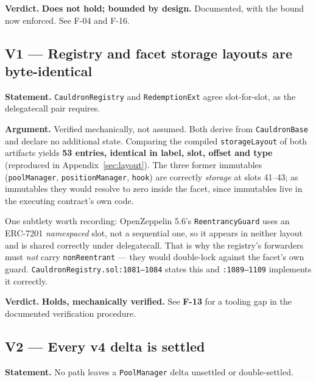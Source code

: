 \documentclass[11pt,a4paper]{article}
\newcommand{\code}[1]{\texttt{\small #1}}
\newcommand{\fileref}[1]{\texttt{\scriptsize #1}}
\begin{document}
\textbf{Verdict.} \textcolor{medium}{\textbf{Does not hold; bounded by design.}}
Documented, with the bound now enforced. See F-04 and F-16.

\subsection*{V1 --- Registry and facet storage layouts are byte-identical}
\textbf{Statement.} \code{CauldronRegistry} and \code{RedemptionExt} agree
slot-for-slot, as the delegatecall pair requires.

\textbf{Argument.} Verified mechanically, not assumed. Both derive from
\code{CauldronBase} and declare no additional state. Comparing the compiled
\code{storageLayout} of both artifacts yields \textbf{53 entries, identical in
label, slot, offset and type} (reproduced in Appendix~\ref{sec:layout}). The
three former immutables (\code{poolManager}, \code{positionManager}, \code{hook})
are correctly \emph{storage} at slots 41--43; as immutables they would resolve to
zero inside the facet, since immutables live in the executing contract's own code.

One subtlety worth recording: OpenZeppelin 5.6's \code{ReentrancyGuard} uses an
ERC-7201 \emph{namespaced} slot, not a sequential one, so it appears in neither
layout and is shared correctly under delegatecall. That is why the registry's
forwarders must \emph{not} carry \code{nonReentrant} --- they would double-lock
against the facet's own guard. \fileref{CauldronRegistry.sol:1081--1084} states
this and \fileref{:1089--1109} implements it correctly.

\textbf{Verdict.} \textcolor{good}{\textbf{Holds, mechanically verified.}}
See \textbf{F-13} for a tooling gap in the documented verification procedure.

\subsection*{V2 --- Every v4 delta is settled}
\textbf{Statement.} No path leaves a \code{PoolManager} delta unsettled or
double-settled.
\end{document}
